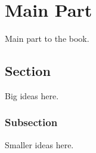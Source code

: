 

\chapter{Main Part}
\label{mainPart}

Main part to the book.
\section{Section}
Big ideas here.
\subsection{Subsection}
Smaller ideas here.




~                 
